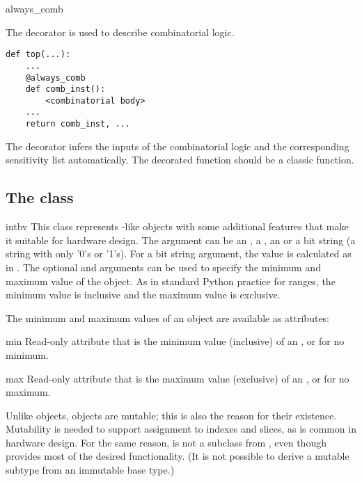 \begin{funcdesc}{always_comb}{}


The  decorator is used to describe combinatorial
logic.


\begin{verbatim}
def top(...):
    ...
    @always_comb
    def comb_inst():
        <combinatorial body>
    ...
    return comb_inst, ...
\end{verbatim}


The  decorator infers the inputs of the combinatorial
logic and the corresponding sensitivity list automatically.
The decorated function should be a classic function.

\end{funcdesc}


\subsection{The  class \label{ref-intbv}}

\begin{classdesc}{intbv}{  
}
This class represents -like objects with some additional
features that make it suitable for hardware design. The 
argument can be an , a , an  or a
bit string (a string with only '0's or '1's). For a bit string
argument, the value is calculated as in .  The optional  and  arguments can be used to
specify the minimum and maximum value of the  object. As
in standard Python practice for ranges, the minimum value is inclusive
and the maximum value is exclusive.
\end{classdesc}

The minimum and maximum values of an  object
are available as attributes:

\begin{memberdesc}[intbv]{min}
Read-only attribute that is the minimum value (inclusive) of an
, or  for no minimum.
\end{memberdesc}
\begin{memberdesc}[intbv]{max}
Read-only attribute that is the maximum value
(exclusive) of an , or  for no 
maximum.
\end{memberdesc}

Unlike  objects,  objects are mutable; this is
also the reason for their existence. Mutability is needed to support
assignment to indexes and slices, as is common in hardware design. For
the same reason,  is not a subclass from ,
even though  provides most of the desired
functionality. (It is not possible to derive a mutable subtype from
an immutable base type.)

